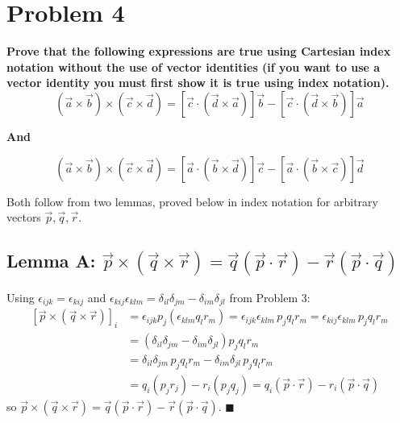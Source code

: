 \documentclass[12pt]{article}
\begin{document}
\newpage

\section*{Problem 4}
\textbf{Prove that the following expressions are true using Cartesian index notation without the use of vector identities (if you want to use a vector identity you must first show it is true using index notation).}
\begin{equation*}
    \left(\vec a\times\vec b\right)\times\left(\vec c\times\vec d\right) = \left[\vec c\cdot\left(\vec d\times\vec a\right)\right]\vec b - \left[\vec c\cdot\left(\vec d\times\vec b\right)\right]\vec a
\end{equation*}
\begin{center}
    \textbf{And}
\end{center}
\begin{equation*}
    \left(\vec a\times\vec b\right)\times\left(\vec c\times\vec d\right) = \left[\vec a\cdot\left(\vec b\times\vec d\right)\right]\vec c - \left[\vec a\cdot\left(\vec b\times\vec c\right)\right]\vec d
\end{equation*}

Both follow from two lemmas, proved below in index notation for arbitrary vectors $\vec p, \vec q, \vec r$.

\subsection*{Lemma A: $\vec p \times (\vec q \times \vec r) = \vec q(\vec p \cdot \vec r) - \vec r(\vec p \cdot \vec q)$}

Using $\epsilon_{ijk} = \epsilon_{kij}$ and $\epsilon_{kij}\epsilon_{klm} = \delta_{il}\delta_{jm} - \delta_{im}\delta_{jl}$ from Problem 3:
\begin{align*}
    \left[\vec p \times (\vec q \times \vec r)\right]_i
    &= \epsilon_{ijk}p_j\left(\epsilon_{klm}q_lr_m\right) = \epsilon_{ijk}\epsilon_{klm}\,p_jq_lr_m = \epsilon_{kij}\epsilon_{klm}\,p_jq_lr_m \\
    &= \left(\delta_{il}\delta_{jm} - \delta_{im}\delta_{jl}\right)p_jq_lr_m \\
    &= \delta_{il}\delta_{jm}\,p_jq_lr_m - \delta_{im}\delta_{jl}\,p_jq_lr_m \\
    &= q_i\left(p_jr_j\right) - r_i\left(p_jq_j\right) = q_i(\vec p\cdot\vec r) - r_i(\vec p \cdot \vec q)
\end{align*}
so $\vec p \times (\vec q \times \vec r) = \vec q(\vec p \cdot \vec r) - \vec r(\vec p \cdot \vec q)$. \hfill $\blacksquare$
\end{document}
